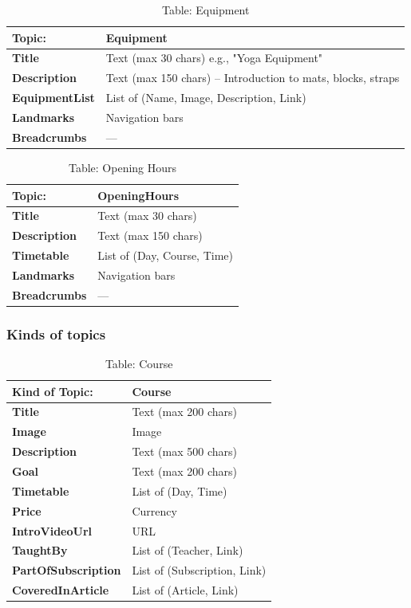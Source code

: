 \begin{table}[H]
\centering
\begin{tabularx}{\textwidth}{|>{\bfseries}l|X|}
\hline
Topic: & \textbf{Equipment} \\
\hline
Title & Text (max 30 chars) e.g., "Yoga Equipment" \\
\hline
Description & Text (max 150 chars) – Introduction to mats, blocks, straps \\
\hline
EquipmentList & List of (Name, Image, Description, Link) \\
\hline
Landmarks & Navigation bars \\
\hline
Breadcrumbs & — \\
\hline
\end{tabularx}
\caption{Table: Equipment}
\end{table}

\begin{table}[H]
\centering
\begin{tabularx}{\textwidth}{|>{\bfseries}l|X|}
\hline
Topic: & \textbf{OpeningHours} \\
\hline
Title & Text (max 30 chars) \\
\hline
Description & Text (max 150 chars) \\
\hline
Timetable & List of (Day, Course, Time) \\
\hline
Landmarks & Navigation bars \\
\hline
Breadcrumbs & — \\
\hline
\end{tabularx}
\caption{Table: Opening Hours}
\end{table}

\subsubsection{Kinds of topics}

\begin{table}[H]
\centering
\begin{tabularx}{\textwidth}{|>{\bfseries}l|X|}
\hline
Kind of Topic: & \textbf{Course} \\
\hline
Title & Text (max 200 chars) \\
\hline
Image & Image \\
\hline
Description & Text (max 500 chars) \\
\hline
Goal & Text (max 200 chars) \\
\hline
Timetable & List of (Day, Time) \\
\hline
Price & Currency \\
\hline
IntroVideoUrl & URL \\
\hline
TaughtBy & List of (Teacher, Link) \\
\hline
PartOfSubscription & List of (Subscription, Link) \\
\hline
CoveredInArticle & List of (Article, Link) \\
\hline
\end{tabularx}
\caption{Table: Course}
\end{table}


